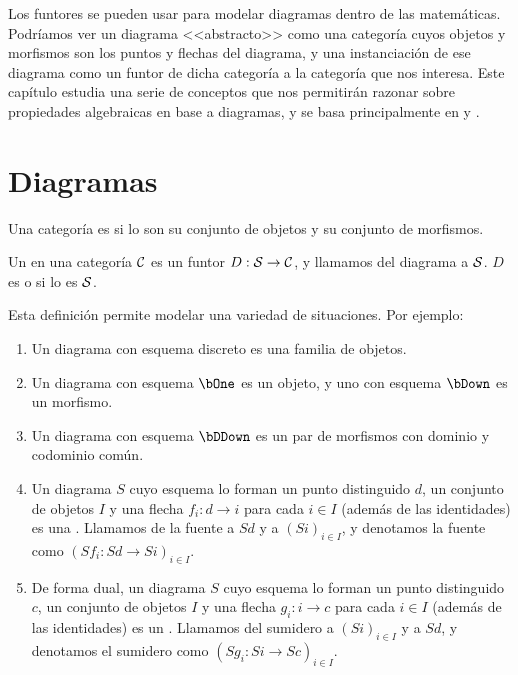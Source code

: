 Los funtores se pueden usar para modelar diagramas dentro de las
matemáticas. Podríamos ver un diagrama <<abstracto>> como una categoría cuyos
objetos y morfismos son los puntos y flechas del diagrama, y una instanciación
de ese diagrama como un funtor de dicha categoría a la categoría que nos
interesa. Este capítulo estudia una serie de conceptos que nos permitirán
razonar sobre propiedades algebraicas en base a diagramas, y se basa
principalmente en \cite[caps. 11--13]{joyofcats} y
\cite[cap. III.3--4]{maclane}.

\section{Diagramas}

\begin{definition}
  Una categoría es  si lo son su conjunto de objetos y su conjunto
  de morfismos.
\end{definition}

\begin{definition}
  Un  en una categoría $\mathcal{C}$ es un funtor $D:\mathcal{S}\to\mathcal{C}$, y
  llamamos  del diagrama a $\mathcal{S}$. $D$ es  o
   si lo es $\mathcal{S}$.
\end{definition}

\begin{example}
  Esta definición permite modelar una variedad de situaciones. Por ejemplo:
  \begin{enumerate}
  \item Un diagrama con esquema discreto es una familia de objetos.
  \item Un diagrama con esquema $\bOne$ es un objeto, y uno con esquema $\bDown$
    es un morfismo.
  \item Un diagrama con esquema $\bDDown$ es un par de morfismos con dominio y
    codominio común.
  \item Un diagrama $S$ cuyo esquema lo forman un punto distinguido $d$, un
    conjunto de objetos $I$ y una flecha $f_i:d\to i$ para cada $i\in I$ (además
    de las identidades) es una . Llamamos  de la
    fuente a $Sd$ y  a $(Si)_{i\in I}$, y denotamos la fuente
    como $(Sf_i:Sd\to Si)_{i\in I}$.
  \item De forma dual, un diagrama $S$ cuyo esquema lo forman un punto
    distinguido $c$, un conjunto de objetos $I$ y una flecha $g_i:i\to c$ para
    cada $i\in I$ (además de las identidades) es un . Llamamos
     del sumidero a $(Si)_{i\in I}$ y  a $Sd$, y
    denotamos el sumidero como $(Sg_i:Si\to Sc)_{i\in I}$.
  \end{enumerate}
\end{example}


